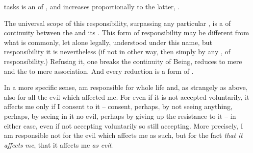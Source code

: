  tasks is an  of , and increases
proportionally to the latter, . 

The universal scope of this responsibility, surpassing any particular
, is a  of continuity between the  and its
.  This form of responsibility may be different from what
is commonly, let alone legally, understood under this name, but responsibility
it is nevertheless (if not in other way, then simply by  any
,  of responsibility.)  Refusing it, one
breaks the continuity of Being, reduces  to mere 
and the  to mere association. And every  reduction
is a form of .    


\pa \mine In a more specific sense,  am responsible for  whole life
and, as strangely as above, also 
for all the evil which affected me. For even if it is not accepted voluntarily,
it affects me only if I consent to it -- consent, perhaps, by not seeing
anything, perhaps, by seeing in it no evil, perhaps by giving up the resistance
to it -- in either case, even if not accepting voluntarily so still
accepting. More precisely, I 
am responsible not for the evil which affects me as such, but for the fact {\em
  that it affects me}, that it affects me {\em as evil}. 

